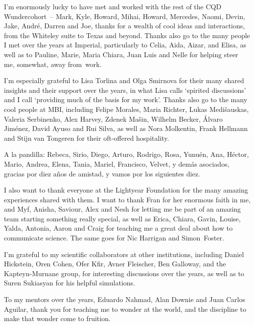 \vspace{\ackskip}
\noindent
I'm enormously lucky to have met and worked with the rest of the CQD Wundercohort~-- Mark, Kyle, Howard, Mihai, Howard, Mercedes, Naomi, Devin, Jake, André, Darren and Joe, thanks for a wealth of cool ideas and interactions, from the Whiteley suite to Texas and beyond. Thanks also go to the many people I met over the years at Imperial, particularly to Celia, Aida, Aizar, and Elisa, as well as to Pauline, Marie, Maria Chiara, Juan Luis and Nelle for helping steer me, somewhat, away from~work.


\vspace{\ackskip}
\noindent
I'm especially grateful to Lisa Torlina and Olga Smirnova for their many shared insights and their support over the years, in what Lisa calls `spirited discussions' and I call `providing much of the basis for my work'. Thanks also go to the many cool people at MBI, including Felipe Morales, Maria Richter, Lukas Medi\v{s}auskas, Valeria Serbinenko, Alex Harvey, Zdenek Ma\v{s}in, Wilhelm Becker, Álvaro Jiménez, David Ayuso and Rui Silva, as well as Nora Molkentin, Frank Hellmann and Stijn van Tongeren for their oft-offered hospitality.


\vspace{\ackskip}
\noindent
A la pandilla: Rebeca, Sirio, Diego, Arturo, Rodrigo, Rosa, Yunuén, Ana, Héctor, Mario, Andrea, Elena, Tania, Mariel, Francisco, Velvet, y demás asociados, gracias por diez años de amistad, y vamos por los siguientes diez. 


\vspace{\ackskip}
\noindent
I also want to thank everyone at the Lightyear Foundation for the many amazing experiences shared with them. I want to thank Fran for her enormous faith in me, and Myf, Anisha, Saviour, Alex and Nesh for letting me be part of an amazing team starting something really special, as well as Erica, Chiara, Gavin, Louise, Yalda, Antonia, Aaron and Craig for teaching me a great deal about how to communicate science. The same goes for Nic Harrigan and Simon~Foster.

\vspace{\ackskip}
\noindent
I'm grateful to my scientific collaborators at other institutions, including Daniel Hickstein, Oren Cohen, Ofer Kfir, Avner Fleischer, Ben Galloway, and the Kapteyn-Murnane group, for interesting discussions over the years, as well as to Suren Sukiasyan for his helpful simulations. 

\vspace{\ackskip}
\noindent
To my mentors over the years, Eduardo Nahmad, Alan Downie and Juan Carlos Aguilar, thank you for teaching me to wonder at the world, and the discipline to make that wonder come to fruition. 

